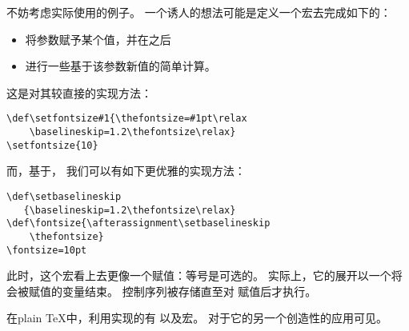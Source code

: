 \documentclass{book}
\begin{document}
不妨考虑实际使用的例子。
一个诱人的想法可能是定义一个宏去完成如下的：
\begin{itemize} \item 将参数赋予某个值，并在之后
\item 进行一些基于该参数新值的简单计算。
\end{itemize}
这是对其较直接的实现方法：
\begin{verbatim}
\def\setfontsize#1{\thefontsize=#1pt\relax
    \baselineskip=1.2\thefontsize\relax}
\setfontsize{10}
\end{verbatim}
而，基于，
我们可以有如下更优雅的实现方法：
\begin{verbatim}
\def\setbaselineskip
   {\baselineskip=1.2\thefontsize\relax}
\def\fontsize{\afterassignment\setbaselineskip
    \thefontsize}
\fontsize=10pt
\end{verbatim}
此时，这个宏看上去更像一个赋值：等号是可选的。
实际上，它的展开以一个将会被赋值的变量结束。
控制序列被存储直至对
赋值后才执行。

在plain {\TeX}中，利用实现的有
以及宏。
对于它的另一个创造性的应用可见\cite{Maus}。
\end{document}
